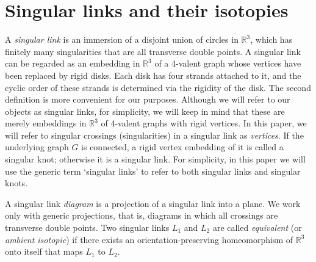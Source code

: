 \documentclass{amsart}\usepackage{amsfonts, amsmath, amssymb}\usepackage{graphicx, epic, epsf, enumerate, stmaryrd}
\theoremstyle{definition}
\numberwithin{equation}{section}
\begin{document}
\section{Singular links and their isotopies}\label{sec:sing-links}

A \textit{singular link} is an immersion of a disjoint union of circles in ${\mathbb{R}}^3$, which has finitely many singularities that are all transverse double points. A singular link can be regarded as an embedding in ${\mathbb{R}}^3$ of a 4-valent graph whose vertices have been replaced by rigid disks. Each disk has four strands attached to it, and the cyclic order of these strands is determined via the rigidity of the disk. The second definition is more convenient for our purposes. Although we will refer to our objects as singular links, for simplicity, we will keep in mind that these are merely embeddings in ${\mathbb{R}}^3$ of 4-valent graphs with rigid vertices. In this paper, we will refer to singular crossings (singularities) in a singular link as \textit{vertices}. If the underlying graph $G$ is connected, a rigid vertex embedding of it is called a singular knot; otherwise it is a singular link. For simplicity, in this paper we will use the generic term `singular links' to refer to both singular links and singular knots.

A singular link \textit{diagram} is a projection of a singular link into a plane. We work only with generic projections, that is, diagrams in which all crossings are transverse double points.
Two singular links $L_1$ and $L_2$ are called \textit{equivalent} (or \textit{ambient isotopic}) if there exists an orientation-preserving homeomorphism of ${\mathbb{R}}^3$ onto itself that maps $L_1$ to $L_2$.
\end{document}
